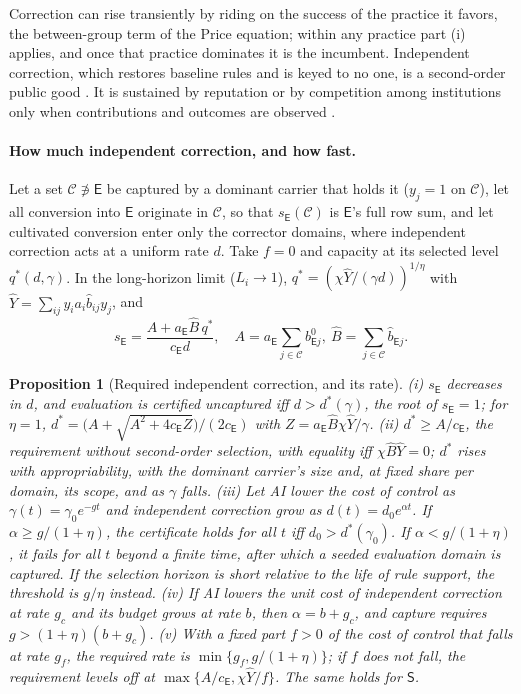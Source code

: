 \documentclass[letterpaper]{article} %
\newtheorem{proposition}{Proposition}
\theoremstyle{definition}
\newcommand{\dE}{\mathsf{E}}
\newcommand{\dS}{\mathsf{S}}
\newcommand{\cC}{\mathcal{C}}
\begin{document}
Correction can rise transiently by riding on the success of the practice it favors, the between-group term of the Price equation; within any practice part (i) applies, and once that practice dominates it is the incumbent. Independent correction, which restores baseline rules and is keyed to no one, is a second-order public good \citep{oliver1980,yamagishi1986,heckathorn1989}. It is sustained by reputation or by competition among institutions only when contributions and outcomes are observed \citep{panchanathan2004,gurerk2006,sigmund2010}.

\paragraph{How much independent correction, and how fast.} Let a set $\cC\not\ni\dE$ be captured by a dominant carrier that holds it ($y_j=1$ on $\cC$), let all conversion into $\dE$ originate in $\cC$, so that $s_\dE(\cC)$ is $\dE$'s full row sum, and let cultivated conversion enter only the corrector domains, where independent correction acts at a uniform rate $d$. Take $f=0$ and capacity at its selected level $q^\ast(d,\gamma)$. In the long-horizon limit ($L_i\to1$), $q^\ast=(\chi\hat Y/(\gamma d))^{1/\eta}$ with $\hat Y=\sum_{ij}y_ia_i\hat b_{ij}y_j$, and
\begin{equation}\label{eq:sE}
s_\dE=\frac{A+a_\dE\hat B\,q^\ast}{c_\dE d},\quad A=a_\dE\!\sum_{j\in\cC}b^0_{\dE j},\ \hat B=\sum_{j\in\cC}\hat b_{\dE j}.
\end{equation}

\begin{proposition}[Required independent correction, and its rate]\label{prop:rate}
(i) $s_\dE$ decreases in $d$, and evaluation is certified uncaptured iff $d>d^\ast(\gamma)$, the root of $s_\dE=1$; for $\eta=1$, $d^\ast=\big(A+\sqrt{A^2+4c_\dE Z}\big)/(2c_\dE)$ with $Z=a_\dE\hat B\chi\hat Y/\gamma$. (ii) $d^\ast\ge A/c_\dE$, the requirement without second-order selection, with equality iff $\chi\hat B\hat Y=0$; $d^\ast$ rises with appropriability, with the dominant carrier's size and, at fixed share per domain, its scope, and as $\gamma$ falls. (iii) Let AI lower the cost of control as $\gamma(t)=\gamma_0e^{-gt}$ and independent correction grow as $d(t)=d_0e^{\alpha t}$. If $\alpha\ge g/(1+\eta)$, the certificate holds for all $t$ iff $d_0>d^\ast(\gamma_0)$. If $\alpha<g/(1+\eta)$, it fails for all $t$ beyond a finite time, after which a seeded evaluation domain is captured. If the selection horizon is short relative to the life of rule support, the threshold is $g/\eta$ instead. (iv) If AI lowers the unit cost of independent correction at rate $g_c$ and its budget grows at rate $b$, then $\alpha=b+g_c$, and capture requires $g>(1+\eta)(b+g_c)$. (v) With a fixed part $f>0$ of the cost of control that falls at rate $g_f$, the required rate is $\min\{g_f,g/(1+\eta)\}$; if $f$ does not fall, the requirement levels off at $\max\{A/c_\dE,\chi\hat Y/f\}$. The same holds for $\dS$.
\end{proposition}
\end{document}
